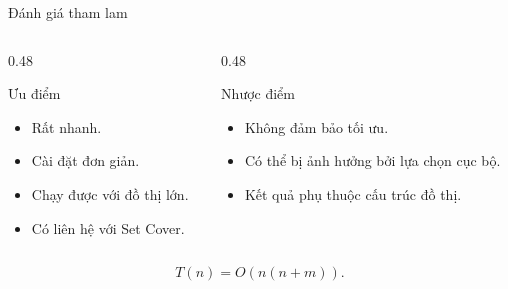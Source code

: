 \documentclass[aspectratio=169, 11pt]{beamer}
\begin{document}
\begin{frame}{Đánh giá tham lam}
  \begin{columns}
    \begin{column}{0.48\textwidth}
      \begin{block}{Ưu điểm}
        \begin{itemize}
          \item Rất nhanh.
          \item Cài đặt đơn giản.
          \item Chạy được với đồ thị lớn.
          \item Có liên hệ với Set Cover.
        \end{itemize}
      \end{block}
    \end{column}
    \begin{column}{0.48\textwidth}
      \begin{block}{Nhược điểm}
        \begin{itemize}
          \item Không đảm bảo tối ưu.
          \item Có thể bị ảnh hưởng bởi lựa chọn cục bộ.
          \item Kết quả phụ thuộc cấu trúc đồ thị.
        \end{itemize}
      \end{block}
    \end{column}
  \end{columns}

  \vspace{0.4cm}
  \[
    T(n)= O(n(n+m)).
  \]
\end{frame}
\end{document}

